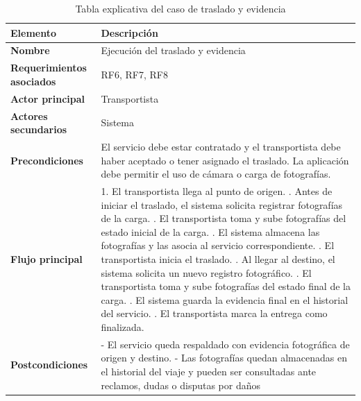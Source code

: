 \begin{table}[H]
	\centering 
	\caption{Tabla explicativa del caso de traslado y evidencia}
	\label{table: Tabla caso traslado y evidencia}
	\renewcommand{\arraystretch}{1.4}
	\begin{tabular}{|p{4cm}|p{11cm}|}
		\hline
		\centering\textbf{Elemento} & \centering\textbf{Descripción}\tabularnewline
		\hline
		\textbf{Nombre} & Ejecución del traslado y evidencia \\
		\hline 
		\textbf{Requerimientos asociados} & RF6, RF7, RF8 \\
		\hline
		\textbf{Actor principal} & Transportista \\
		\hline
		\textbf{Actores secundarios} & Sistema \\
		\hline
		\textbf{Precondiciones} & El servicio debe estar contratado y el transportista debe haber aceptado o tener asignado el traslado. La aplicación debe permitir el uso de cámara o carga de fotografías. \\
		\hline
		\textbf{Flujo principal} & 
		1. El transportista llega al punto de origen. \newline
		2. Antes de iniciar el traslado, el sistema solicita registrar fotografías de la carga. \newline
		3. El transportista toma y sube fotografías del estado inicial de la carga. \newline
		4. El sistema almacena las fotografías y las asocia al servicio correspondiente. \newline
		5. El transportista inicia el traslado. \newline
		6. Al llegar al destino, el sistema solicita un nuevo registro fotográfico. \newline
		7. El transportista toma y sube fotografías del estado final de la carga. \newline
		8. El sistema guarda la evidencia final en el historial del servicio. \newline
		9. El transportista marca la entrega como finalizada. \\
		\hline
		\textbf{Postcondiciones} & 
		- El servicio queda respaldado con evidencia fotográfica de origen y destino. \newline
		- Las fotografías quedan almacenadas en el historial del viaje y pueden 
		ser consultadas ante reclamos, dudas o disputas por daños \\
		\hline
	\end{tabular} 
\end{table}

